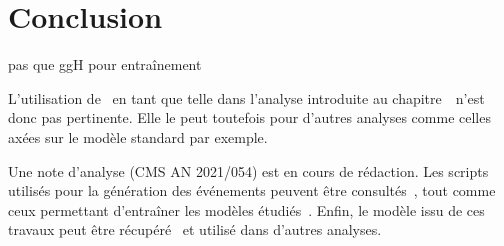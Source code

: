\section{Conclusion}\label{chapter-ML-section-conclusion}


pas que ggH pour entraînement

L'utilisation de \mml\ en tant que telle dans l'analyse introduite au chapitre~\ n'est donc pas pertinente.
Elle le peut toutefois pour d'autres analyses comme celles axées sur le modèle standard par exemple.


Une note d'analyse (CMS AN 2021/054) \cite{CMS-NOTE-2021-054} est en cours de rédaction.
Les scripts utilisés pour la génération des événements peuvent être consultés~\cite{fastsim_ece},
tout comme ceux permettant d'entraîner les modèles étudiés~\cite{DL_for_HTT_mass}.
Enfin, le modèle issu de ces travaux peut être récupéré~\cite{DiTau_ML_mass} et utilisé dans d'autres analyses.